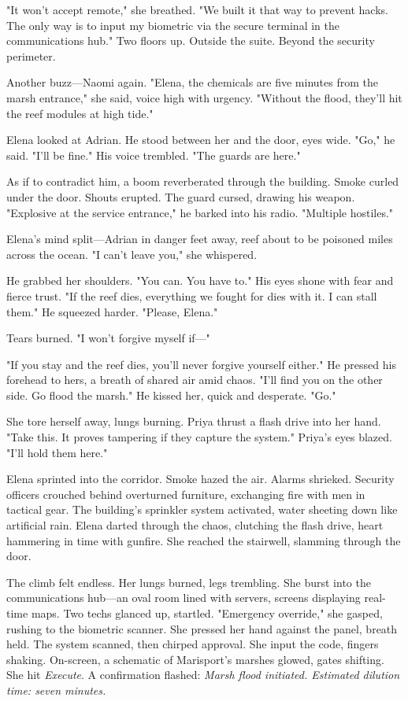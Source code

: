 "It won't accept remote," she breathed. "We built it that way to prevent hacks. The only way is to input my biometric via the secure terminal in the communications hub." Two floors up. Outside the suite. Beyond the security perimeter.

Another buzz—Naomi again. "Elena, the chemicals are five minutes from the marsh entrance," she said, voice high with urgency. "Without the flood, they'll hit the reef modules at high tide."

Elena looked at Adrian. He stood between her and the door, eyes wide. "Go," he said. "I'll be fine." His voice trembled. "The guards are here."

As if to contradict him, a boom reverberated through the building. Smoke curled under the door. Shouts erupted. The guard cursed, drawing his weapon. "Explosive at the service entrance," he barked into his radio. "Multiple hostiles."

Elena's mind split—Adrian in danger feet away, reef about to be poisoned miles across the ocean. "I can't leave you," she whispered.

He grabbed her shoulders. "You can. You have to." His eyes shone with fear and fierce trust. "If the reef dies, everything we fought for dies with it. I can stall them." He squeezed harder. "Please, Elena."

Tears burned. "I won't forgive myself if—"

"If you stay and the reef dies, you'll never forgive yourself either." He pressed his forehead to hers, a breath of shared air amid chaos. "I'll find you on the other side. Go flood the marsh." He kissed her, quick and desperate. "Go."

She tore herself away, lungs burning. Priya thrust a flash drive into her hand. "Take this. It proves tampering if they capture the system." Priya's eyes blazed. "I'll hold them here."

Elena sprinted into the corridor. Smoke hazed the air. Alarms shrieked. Security officers crouched behind overturned furniture, exchanging fire with men in tactical gear. The building's sprinkler system activated, water sheeting down like artificial rain. Elena darted through the chaos, clutching the flash drive, heart hammering in time with gunfire. She reached the stairwell, slamming through the door.

The climb felt endless. Her lungs burned, legs trembling. She burst into the communications hub—an oval room lined with servers, screens displaying real-time maps. Two techs glanced up, startled. "Emergency override," she gasped, rushing to the biometric scanner. She pressed her hand against the panel, breath held. The system scanned, then chirped approval. She input the code, fingers shaking. On-screen, a schematic of Marisport's marshes glowed, gates shifting. She hit \textit{Execute}. A confirmation flashed: \textit{Marsh flood initiated. Estimated dilution time: seven minutes.}

